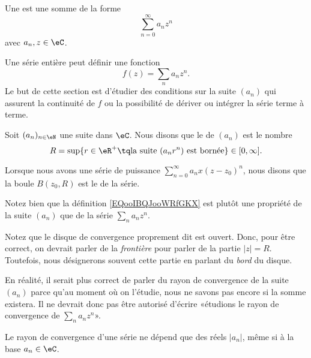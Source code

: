 \begin{definition}		\label{DEFooLGGNooGapMIK}
	Une  est une somme de la forme
	\begin{equation}
		\sum_{n=0}^{\infty}a_nz^n
	\end{equation}
	avec \( a_n,z\in\eC\).
\end{definition}
Une série entière peut définir une fonction
\begin{equation}
	f(z)=\sum_na_nz^n.
\end{equation}
Le but de cette section est d'étudier des conditions sur la suite \( (a_n)\) qui assurent la continuité de \( f\) ou la possibilité de dériver ou intégrer la série terme à terme.

\begin{definition}  \label{DefZWKOZOl}
	Soit \( (a_n)_{n\in \eN}\) une suite dans \( \eC\). Nous disons que le  de \( (a_n)\) est le nombre
	\begin{equation}		\label{EQooIBQJooWRfGKX}
		R=\sup\{ r\in \eR^+\tq \text{la suite }(a_nr^n)\text{ est bornée} \}\in\mathopen[ 0 , \infty \mathclose].
	\end{equation}

	Lorsque nous avons une série de puissance \( \sum_{n=0}^{\infty}a_nx(z-z_0)^n\), nous disons que la boule \( B(z_0,R)\) est le  de la série.

	Notez bien que la définition \eqref{EQooIBQJooWRfGKX} est plutôt une propriété de la suite \( (a_n)\) que de la série \( \sum_na_nz^n\).
\end{definition}

\begin{normaltext}
	Notez que le disque de convergence proprement dit est ouvert. Donc, pour être correct, on devrait parler de la \emph{frontière} pour parler de la partie \( | z |=R\). Toutefois, nous désignerons souvent cette partie en parlant du \emph{bord} du disque.
\end{normaltext}

\begin{normaltext}
	En réalité, il serait plus correct de parler du rayon de convergence de la suite \( (a_n)\) parce qu'au moment où on l'étudie, nous ne savons pas encore si la somme existera. Il ne devrait donc pas être autorisé d'écrire «étudions le rayon de convergence de \( \sum_na_nz^n\)».

	Le rayon de convergence d'une série ne dépend que des réels \( | a_n |\), même si à la base \( a_n\in \eC\).
\end{normaltext}

